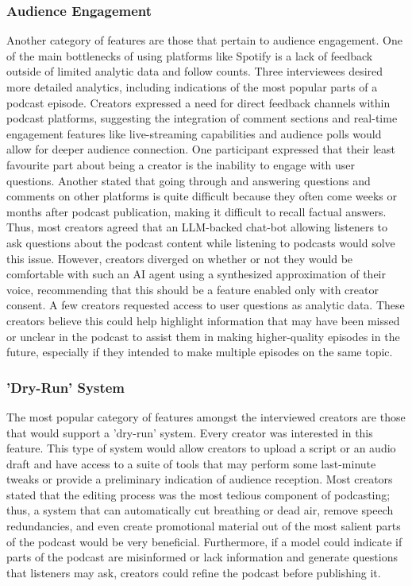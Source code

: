 \documentclass[12pt]{report}
\begin{document}
\begin{myfont}
        \subsubsection{Audience Engagement}
        \indent Another category of features are those that pertain to audience engagement. One of the main bottlenecks of using platforms like Spotify is a lack of feedback outside of limited analytic data and follow counts. Three interviewees desired more detailed analytics, including indications of the most popular parts of a podcast episode. Creators expressed a need for direct feedback channels within podcast platforms, suggesting the integration of comment sections and real-time engagement features like live-streaming capabilities and audience polls would allow for deeper audience connection. One participant expressed that their least favourite part about being a creator is the inability to engage with user questions. Another stated that going through and answering questions and comments on other platforms is quite difficult because they often come weeks or months after podcast publication, making it difficult to recall factual answers. Thus, most creators agreed that an LLM-backed chat-bot allowing listeners to ask questions about the podcast content while listening to podcasts would solve this issue. However, creators diverged on whether or not they would be comfortable with such an AI agent using a synthesized approximation of their voice, recommending that this should be a feature enabled only with creator consent. A few creators requested access to user questions as analytic data. These creators believe this could help highlight information that may have been missed or unclear in the podcast to assist them in making higher-quality episodes in the future, especially if they intended to make multiple episodes on the same topic.

        \subsubsection{'Dry-Run' System}
        \indent The most popular category of features amongst the interviewed creators are those that would support a 'dry-run' system. Every creator was interested in this feature. This type of system would allow creators to upload a script or an audio draft and have access to a suite of tools that may perform some last-minute tweaks or provide a preliminary indication of audience reception. Most creators stated that the editing process was the most tedious component of podcasting; thus, a system that can automatically cut breathing or dead air, remove speech redundancies, and even create promotional material out of the most salient parts of the podcast would be very beneficial. Furthermore, if a model could indicate if parts of the podcast are misinformed or lack information and generate questions that listeners may ask, creators could refine the podcast before publishing it.


\end{myfont}
\end{document}
